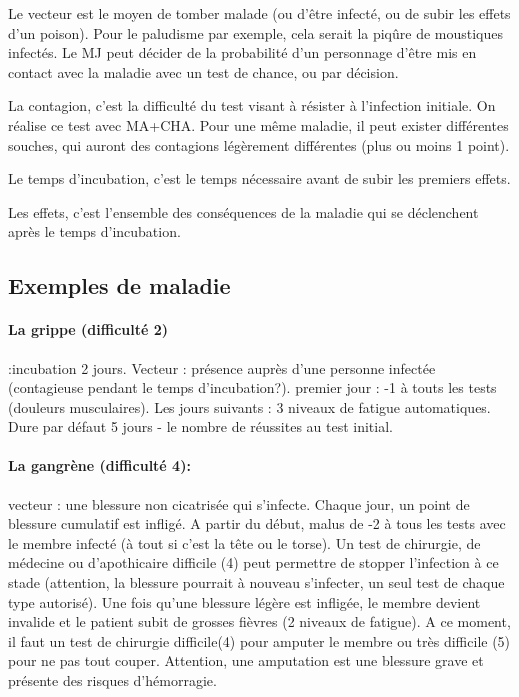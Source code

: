 \documentclass[10pt,a4paper,twocolumn]{book}
\begin{document}
Le vecteur est le moyen de tomber malade (ou d'être infecté, ou de subir les effets d'un poison). Pour le paludisme par exemple, cela serait la piqûre de moustiques infectés. Le MJ peut décider de la probabilité d'un personnage d'être mis en contact avec la maladie avec un test de chance, ou par décision.

La contagion, c'est la difficulté du test visant à résister à l'infection initiale. On réalise ce test avec MA+CHA. Pour une même maladie, il peut exister différentes souches, qui auront des contagions légèrement différentes (plus ou moins 1 point).

Le temps d'incubation, c'est le temps nécessaire avant de subir les premiers effets.

Les effets, c'est l'ensemble des conséquences de la maladie qui se déclenchent après le temps d'incubation.

\subsection*{Exemples de maladie}
\paragraph{La grippe (difficulté 2)} :incubation 2 jours. Vecteur : présence auprès d'une personne infectée (contagieuse pendant le temps d'incubation?). premier jour : -1 à touts les tests (douleurs musculaires). Les jours suivants : 3 niveaux de fatigue automatiques. Dure par défaut 5 jours - le nombre de réussites au test initial.
\paragraph{La gangrène (difficulté 4):} vecteur : une blessure non cicatrisée qui s'infecte. Chaque jour, un point de blessure cumulatif est infligé. A partir du début, malus de -2 à tous les tests avec le membre infecté (à tout si c'est la tête ou le torse). Un test de chirurgie, de médecine ou d'apothicaire difficile (4) peut permettre de stopper l'infection à ce stade (attention, la blessure pourrait à nouveau s'infecter, un seul test de chaque type autorisé). Une fois qu'une blessure légère est infligée, le membre devient invalide et le patient subit de grosses fièvres (2 niveaux de fatigue). A ce moment, il faut un test de chirurgie difficile(4) pour amputer le membre ou très difficile (5) pour ne pas tout couper. Attention, une amputation est une blessure grave et présente des risques d'hémorragie.
\end{document}
